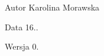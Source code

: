 \begin{DoxyAuthor}{Autor}
Karolina Morawska 
\end{DoxyAuthor}
\begin{DoxyDate}{Data}
16.. 
\end{DoxyDate}
\begin{DoxyVersion}{Wersja}
0. 
\end{DoxyVersion}
